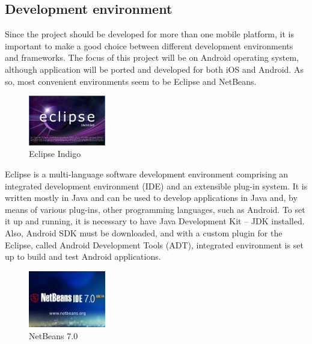 \pagebreak
\subsection{Development environment}

Since the project should be developed for more than one mobile platform, it is important to make a good choice between different development environments and frameworks. The focus of this project will be on Android operating system, although application will be ported and developed for both iOS and Android.
As so, most convenient environments seem to be Eclipse and NetBeans.\newline

\begin{figure}[htb]
	\centering
	\includegraphics[width=0.3\textwidth]{organizational/development_environment/Eclipse.png}
	\caption{Eclipse Indigo}
	\label{fig:Eclipse Indigo}
\end{figure}
	
Eclipse is a multi-language software development environment comprising an integrated development environment (IDE) and an extensible plug-in system. It is written mostly in Java and can be used to develop applications in Java and, by means of various plug-ins, other programming languages, such as Android. 
To set it up and running, it is necessary to have Java Development Kit – JDK installed. Also, Android SDK must be downloaded, and with a custom plugin for the Eclipse, called Android Development Tools (ADT), integrated environment is set up to build and test Android applications.\newline

\begin{figure}[htb]
	\centering
	\includegraphics[width=0.3\textwidth]{organizational/development_environment/netBeans.png}
	\caption{NetBeans 7.0}
	\label{fig:NetBeans}
\end{figure}

